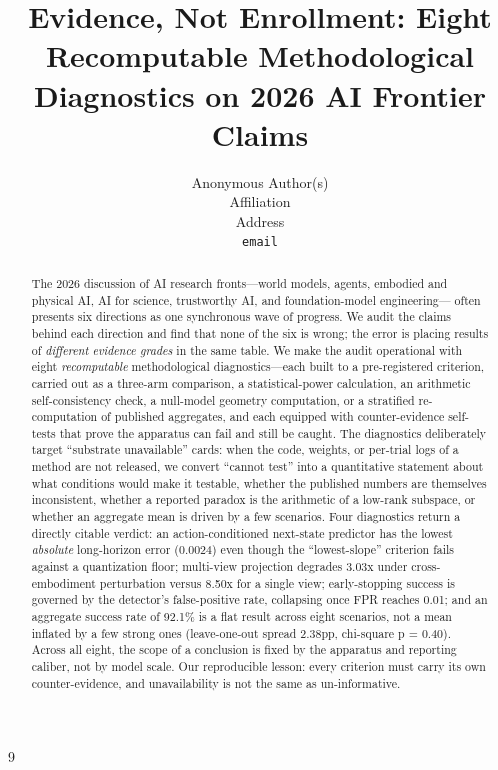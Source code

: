 \documentclass[10pt]{article}
\title{Evidence, Not Enrollment: Eight Recomputable Methodological\\ Diagnostics on 2026 AI Frontier Claims}
\author{%
  Anonymous Author(s) \\
  Affiliation \\
  Address \\
  \texttt{email}
}
\begin{document}
\maketitle

\begin{abstract}
The 2026 discussion of AI research fronts---world models, agents, embodied and
physical AI, AI for science, trustworthy AI, and foundation-model engineering---
often presents six directions as one synchronous wave of progress. We audit the
claims behind each direction and find that none of the six is wrong; the error is
placing results of \emph{different evidence grades} in the same table. We make the
audit operational with eight \emph{recomputable} methodological diagnostics---each
built to a pre-registered criterion, carried out as a three-arm comparison, a
statistical-power calculation, an arithmetic self-consistency check, a null-model
geometry computation, or a stratified re-computation of published aggregates, and
each equipped with counter-evidence self-tests that prove the apparatus can fail
and still be caught. The diagnostics deliberately target ``substrate
unavailable'' cards: when the code, weights, or per-trial logs of a method are not
released, we convert ``cannot test'' into a quantitative statement about what
conditions would make it testable, whether the published numbers are themselves
inconsistent, whether a reported paradox is the arithmetic of a low-rank subspace,
or whether an aggregate mean is driven by a few scenarios. Four diagnostics return
a directly citable verdict: an action-conditioned next-state predictor has the
lowest \emph{absolute} long-horizon error (0.0024) even though the
``lowest-slope'' criterion fails against a quantization floor; multi-view
projection degrades 3.03x under cross-embodiment perturbation versus 8.50x for a
single view; early-stopping success is governed by the detector's false-positive
rate, collapsing once FPR reaches 0.01; and an aggregate success rate of 92.1\%
is a flat result across eight scenarios, not a mean inflated by a few strong ones
(leave-one-out spread 2.38pp, chi-square p = 0.40). Across all eight, the scope of
a conclusion is fixed by the apparatus and reporting caliber, not by model scale.
Our reproducible lesson: every criterion must carry its own counter-evidence, and
unavailability is not the same as un-informative.
\end{abstract}







\begin{thebibliography}{9}

\end{thebibliography}
\end{document}
